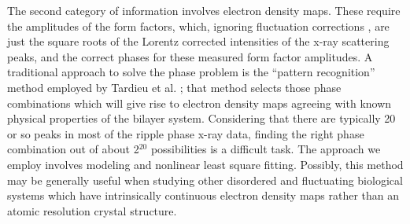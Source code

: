 The second category of information involves electron density maps.  These
require the amplitudes of the form factors, which, ignoring
fluctuation corrections \cite{Nagle96}, are just the square roots of
the Lorentz corrected intensities of the x-ray scattering peaks,
and the correct phases for these measured form factor amplitudes.
A traditional approach to solve the phase problem is the 
``pattern recognition'' method employed by Tardieu et al. 
\cite{Tar73}; that method
selects those phase combinations which will give rise to electron density maps 
agreeing with known physical properties of the bilayer system.
Considering that there are typically 20 or so 
peaks in most of the ripple phase x-ray data, finding the right phase 
combination out of about 2$^{20}$ possibilities is a difficult task.
The approach we employ involves modeling and nonlinear least square fitting.
Possibly, this method may be generally useful when studying other disordered
and fluctuating biological systems which have intrinsically continuous 
electron density maps rather than an atomic resolution crystal structure.
